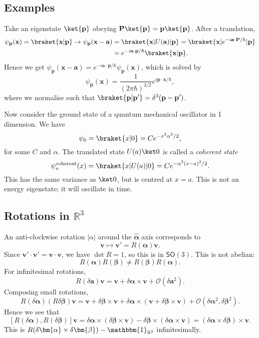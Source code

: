 \documentclass[12pt]{article}
\begin{document}
\subsection{Examples}
\label{sub:com_ex}

Take an eigenstate $\ket{\mathbf{p}}$ obeying $\mathbf{P} \ket{\mathbf{p}} = \mathbf{p} \ket{\mathbf{p}}$. After a translation,
\begin{align*}
	\psi_{\mathbf{p}}(\mathbf{x}) = \braket{\mathbf{x}|\mathbf{p}} \to \psi_{\mathbf{p}}(\mathbf{x} - \mathbf{a}) &= \braket{\mathbf{x}|U(\mathbf{a})|\mathbf{p}} = \braket{\mathbf{x}|e^{-i\mathbf{a} \cdot \mathbf{P}/\hbar}|\mathbf{p}} \\
														      &= e^{-i\mathbf{a}\cdot \mathbf{p}/\hbar} \braket{\mathbf{x}|\mathbf{p}}.
\end{align*}
Hence we get $\psi_{\mathbf{p}}(\mathbf{x} - \mathbf{a}) = e^{-i \mathbf{a} \cdot \mathbf{p}/\hbar}\psi_{\mathbf{p}}(\mathbf{x})$, which is solved by
\[
\psi_{\mathbf{p}}(\mathbf{x}) = \frac{1}{(2 \pi \hbar)^{3/2}} e^{i \mathbf{p} \cdot \mathbf{x}/\hbar},
\]
where we normalise such that $\braket{\mathbf{p}|\mathbf{p}'} = \delta^3(\mathbf{p} - \mathbf{p}')$.

Now consider the ground state of a quantum mechanical oscillator in 1 dimension. We have
\[
	\psi_0 = \braket{x|0} = C e^{-x^2 \alpha^2/2},
\]
for some $C$ and $\alpha$. The translated state $U(a)\ket 0$ is called a \emph{coherent state}
\[
	\psi_{a}^{\mathrm{coherent}}(x) = \braket{x|U(a)|0} = C e^{-\alpha^2(x-a)^2/2}.
\]
This has the same variance as $\ket 0$, but is centred at $x = a$. This is not an energy eigenstate; it will oscillate in time.

\subsection{\texorpdfstring{Rotations in $\mathbb{R}^3$}{Rotations in R3}}
\label{sub:rotations}

An anti-clockwise rotation $|\bm{}{\alpha}|$ around the $\bm{\hat \alpha}$ axis corresponds to
\[
\mathbf{v} \mapsto \mathbf{v}' = R(\bm{\alpha})\mathbf{v}.
\]
Since $\mathbf{v}' \cdot \mathbf{v}' = \mathbf{v} \cdot \mathbf{v}$, we have $\det R = 1$, so this is in $\mathsf{SO}(3)$. This is not abelian:
\[
R(\bm{\alpha})R(\bm{\beta}) \neq R(\bm{\beta})R(\bm{\alpha}).
\]
For infinitesimal rotations,
\[
R(\delta \bm{a}) \mathbf{v} = \mathbf{v} + \delta \bm{\alpha} \times \mathbf{v} + \mathcal{O}(\delta \bm{a}^2).
\]
Composing small rotations,
\[
R(\delta \bm{\alpha})(R \delta \bm{\beta}) \mathbf{v} = \mathbf{v} + \delta \bm{\beta} \times \mathbf{v} + \delta \bm{\alpha}\times (\mathbf{v} + \delta \bm{\beta} \times \mathbf{v}) + \mathcal{O}(\delta \bm{\alpha}^2, \delta \bm{\beta}^2).
\]
Hence we see that
\[
	[R(\delta \bm{\alpha}), R(\delta \bm{\beta})] \mathbf{v} = \delta \bm{\alpha} \times(\delta \bm{\beta} \times \mathbf{v}) - \delta \bm{\beta} \times (\delta \bm{\alpha} \times \mathbf{v}) = (\delta \bm{\alpha} \times \delta \bm{\beta}) \times \mathbf{v}.
\]
This is $R(\delta \bm{\alpha} \times \delta \bm{\beta}) - \mathbbm{1}_{\mathbb{R}^3}$ infinitesimally.
\end{document}
